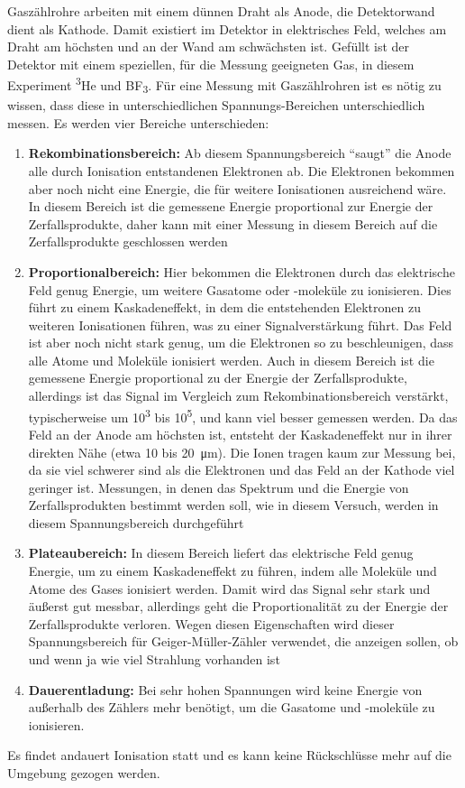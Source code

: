 \documentclass[german, %
parskip=full, %
bibliography=totoc, %
]{scrartcl}
\begin{document}
Gaszählrohre arbeiten mit einem dünnen Draht als Anode, die Detektorwand dient als Kathode. Damit existiert im Detektor in elektrisches Feld, welches am Draht am höchsten und an der Wand am schwächsten ist. Gefüllt ist der Detektor mit einem speziellen, für die Messung geeigneten Gas, in diesem Experiment \textsuperscript{3}He und BF\textsubscript{3}. Für eine Messung mit Gaszählrohren ist es nötig zu wissen, dass diese in unterschiedlichen Spannungs-Bereichen unterschiedlich messen. Es werden vier Bereiche unterschieden:
\begin{enumerate}
\item \textbf{Rekombinationsbereich: }Ab diesem Spannungsbereich "`saugt"' die Anode alle durch Ionisation entstandenen Elektronen ab. Die Elektronen bekommen aber noch nicht eine Energie, die für weitere Ionisationen ausreichend wäre. In diesem Bereich ist die gemessene Energie proportional zur Energie der Zerfallsprodukte, daher kann mit einer Messung in diesem Bereich auf die Zerfallsprodukte geschlossen werden
\item \textbf{Proportionalbereich: }Hier bekommen die Elektronen durch das elektrische Feld genug Energie, um weitere Gasatome oder -moleküle zu ionisieren. Dies führt zu einem Kaskadeneffekt, in dem die entstehenden Elektronen zu weiteren Ionisationen führen, was zu einer Signalverstärkung führt. Das Feld ist aber noch nicht stark genug, um die Elektronen so zu beschleunigen, dass alle Atome und Moleküle ionisiert werden. Auch in diesem Bereich ist die gemessene Energie proportional zu der Energie der Zerfallsprodukte, allerdings ist das Signal im Vergleich zum Rekombinationsbereich verstärkt, typischerweise um 10\textsuperscript{3} bis 10\textsuperscript{5}, und kann viel besser gemessen werden. Da das Feld an der Anode am höchsten ist, entsteht der Kaskadeneffekt nur in ihrer direkten Nähe (etwa 10 bis \SI{20}{\micro\meter}). Die Ionen tragen kaum zur Messung bei, da sie viel schwerer sind als die Elektronen und das Feld an der Kathode viel geringer ist. Messungen, in denen das Spektrum und die Energie von Zerfallsprodukten bestimmt werden soll, wie in diesem Versuch, werden in diesem Spannungsbereich durchgeführt
\item \textbf{Plateaubereich: }In diesem Bereich liefert das elektrische Feld genug Energie, um zu einem Kaskadeneffekt zu führen, indem alle Moleküle und Atome des Gases ionisiert werden. Damit wird das Signal sehr stark und äußerst gut messbar, allerdings geht die Proportionalität zu der Energie der Zerfallsprodukte verloren. Wegen diesen Eigenschaften wird dieser Spannungsbereich für Geiger-Müller-Zähler verwendet, die anzeigen sollen, ob und wenn ja wie viel Strahlung vorhanden ist
\item \textbf{Dauerentladung: }Bei sehr hohen Spannungen wird keine Energie von außerhalb des Zählers mehr benötigt, um die Gasatome und -moleküle zu ionisieren.
\end{enumerate} 
Es findet andauert Ionisation statt und es kann keine Rückschlüsse mehr auf die Umgebung gezogen werden.
\end{document}
